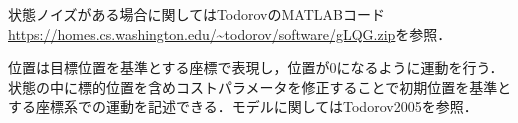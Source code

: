 状態ノイズがある場合に関してはTodorovのMATLABコード \url{https://homes.cs.washington.edu/~todorov/software/gLQG.zip}を参照．

位置は目標位置を基準とする座標で表現し，位置が0になるように運動を行う．状態の中に標的位置を含めコストパラメータを修正することで初期位置を基準とする座標系での運動を記述できる．モデルに関してはTodorov2005を参照．
